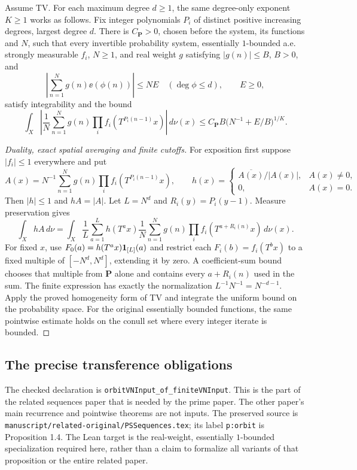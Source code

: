 \begin{auxlemma}\label{l:orbit-transference}
\leanok
Assume TV. For each maximum degree $d\geq1$, the same degree-only exponent
$K\geq1$ works as follows. Fix integer polynomials $P_i$ of distinct positive
increasing degrees, largest degree $d$. There is $C_{\mathbf P}>0$, chosen
before the system, its functions and $N$, such that every invertible probability
system, essentially $1$-bounded a.e. strongly measurable $f_i$, $N\geq1$, and
real weight $g$ satisfying $|g(n)|\leq B$, $B>0$, and
\[
 \left|\sum_{n=1}^N g(n)\ee(\phi(n))\right|\leq NE
 \quad(\deg\phi\leq d),\qquad E\geq0,
\]
satisfy integrability and the bound
\[
 \int_X\left|\frac1N\sum_{n=1}^N g(n)
     \prod_i f_i(T^{P_i(n-1)}x)\right|\,d\nu(x)
 \leq C_{\mathbf P}B\bigl(N^{-1}+E/B\bigr)^{1/K}.
\]
\end{auxlemma}
\begin{proof}[Duality, exact spatial averaging and finite cutoffs]
\leanok
For exposition first suppose $|f_i|\leq1$ everywhere and put
\[
 A(x)=N^{-1}\sum_{n=1}^N g(n)\prod_i f_i(T^{P_i(n-1)}x),\qquad
 h(x)=\begin{cases}\overline{A(x)}/|A(x)|,&A(x)\ne0,\\0,&A(x)=0.\end{cases}
\]
Then $|h|\leq1$ and $hA=|A|$. Let $L=N^d$ and $R_i(y)=P_i(y-1)$.
Measure preservation gives
\[
 \int_X hA\,d\nu
 =\int_X\frac1L\sum_{a=1}^L h(T^ax)
          \frac1N\sum_{n=1}^N g(n)
          \prod_i f_i(T^{a+R_i(n)}x)\,d\nu(x).
\]
For fixed $x$, use $F_0(a)=h(T^ax)\mathbf 1_{[L]}(a)$ and restrict each
$F_i(b)=f_i(T^bx)$ to a fixed multiple of $[-N^d,N^d]$, extending it by zero.
A coefficient-sum bound chooses that multiple from $\mathbf P$ alone and
contains every $a+R_i(n)$ used in the sum. The finite expression has exactly
the normalization $L^{-1}N^{-1}=N^{-d-1}$. Apply the proved homogeneity form
of TV and integrate the uniform bound on the probability space. For the
original essentially bounded functions, the same pointwise estimate holds
on the conull set where every integer iterate is bounded.
\end{proof}
\ifDetailed
\subsection*{The precise transference obligations}
The checked declaration is \texttt{orbitVNInput\_\allowbreak{}of\_\allowbreak{}finiteVNInput}.
This is the part of the related sequences paper that is needed by the prime
paper. The other paper's main recurrence and pointwise theorems are not inputs.
The preserved source is \texttt{manuscript/}\allowbreak\texttt{related-original/}\allowbreak\texttt{PSSequences.tex};
its label \texttt{p:orbit} is Proposition 1.4. The Lean target is the real-weight,
essentially $1$-bounded specialization required here, rather than a claim to
formalize all variants of that proposition or the entire related paper.

